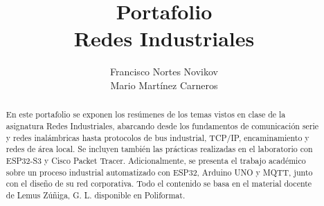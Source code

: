 \documentclass[12pt,spanish]{plantilla_proyecto}
\title{Portafolio \\ Redes Industriales}
\author{Francisco Nortes Novikov \\ Mario Martínez Carneros}
\begin{document}

\setcounter{tocdepth}{1}
\makeindexes


\begin{abstract}
En este portafolio se exponen los resúmenes de los temas vistos en clase de la asignatura Redes Industriales, abarcando desde los fundamentos de comunicación serie y redes inalámbricas hasta protocolos de bus industrial, TCP/IP, encaminamiento y redes de área local. Se incluyen también las prácticas realizadas en el laboratorio con ESP32-S3 y Cisco Packet Tracer. Adicionalmente, se presenta el trabajo académico sobre un proceso industrial automatizado con ESP32, Arduino UNO y MQTT, junto con el diseño de su red corporativa. Todo el contenido se basa en el material docente de Lemus Zúñiga, G. L. disponible en Poliformat.
\end{abstract}


\mainmatter
















\end{document}
